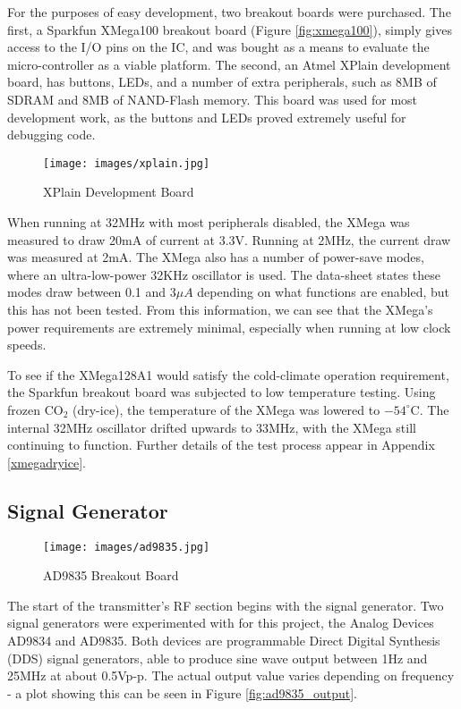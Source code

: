 \documentclass[a4paper,12pt]{article}
\begin{document}
For the purposes of easy development, two breakout boards were purchased. The first, a Sparkfun XMega100 breakout board (Figure \ref{fig:xmega100}), simply gives access to the I/O pins on the IC, and was bought as a means to evaluate the micro-controller as a viable platform. The second, an Atmel XPlain development board, has buttons, LEDs, and a number of extra peripherals, such as 8MB of SDRAM and 8MB of NAND-Flash memory. This board was used for most development work, as the buttons and LEDs proved extremely useful for debugging code.

\begin{wrapfigure}{l}{0.4\textwidth}
  \begin{center}
    \texttt{[image: images/xplain.jpg]}
  \end{center}
  \caption{XPlain Development Board}
  \label{fig:xplain}
\end{wrapfigure}

When running at 32MHz with most peripherals disabled, the XMega was measured to draw 20mA of current at 3.3V. Running at 2MHz, the current draw was measured at 2mA. The XMega also has a number of power-save modes, where an ultra-low-power 32KHz oscillator is used. The data-sheet states these modes draw between 0.1 and $3\mu A$ depending on what functions are enabled, but this has not been tested. From this information, we can see that the XMega's power requirements are extremely minimal, especially when running at low clock speeds.

To see if the XMega128A1 would satisfy the cold-climate operation requirement, the Sparkfun breakout board was subjected to low temperature testing. Using frozen CO$_2$ (dry-ice), the temperature of the XMega was lowered to $-54^\circ$C. The internal 32MHz oscillator drifted upwards to 33MHz, with the XMega still continuing to function. Further details of the test process appear in  Appendix \ref{xmegadryice}.


\subsection{Signal Generator}
\begin{wrapfigure}{r}{0.3\textwidth}
  \begin{center}
    \texttt{[image: images/ad9835.jpg]}
  \end{center}
  \caption{AD9835 Breakout Board}
  \label{fig:ad9835}
\end{wrapfigure}
The start of the transmitter's RF section begins with the signal generator. Two signal generators were experimented with for this project, the Analog Devices AD9834 and AD9835. Both devices are programmable Direct Digital Synthesis (DDS) signal generators, able to produce sine wave output between 1Hz and 25MHz at about 0.5Vp-p. The actual output value varies depending on frequency - a plot showing this can be seen in Figure \ref{fig:ad9835_output}.
\end{document}

